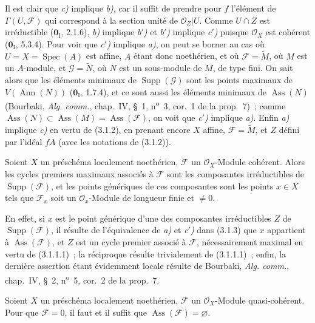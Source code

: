 Il est clair que \emph{c)} implique \emph{b)}, car il suffit de prendre pour
$f$ l'élément de $\Gamma(U,\mathcal F)$ qui correspond à la section unité de
$\mathcal O_Z|U$. Comme $U\cap Z$ est irréductible ($\mathbf{0}_{\mathrm I}$, 2.1.6),
\emph{b)} implique \emph{b$'$)} et \emph{b$'$)} implique \emph{c$'$)} puisque
$\mathcal O_X$ est cohérent ($\mathbf{0}_{\mathrm I}$, 5.3.4). Pour voir que
\emph{c$'$)} implique \emph{a)}, on peut se borner au cas où
$U=X=\operatorname{Spec}(A)$ est affine, $A$ étant donc noethérien, et où
$\mathcal F=\widetilde M$, où $M$ est un $A$-module, et
$\mathcal G=\widetilde N$, où $N$ est un sous-module de $M$, de type fini.
On sait alors que les éléments minimaux de $\operatorname{Supp}(\mathcal G)$
sont les points maximaux de $V(\operatorname{Ann}(N))$ ($\mathbf{0}_{\mathrm I}$, 1.7.4),
et ce sont aussi les éléments minimaux de $\operatorname{Ass}(N)$ (Bourbaki,
\emph{Alg. comm.}, chap.~IV, \S~1, n\textsuperscript{o}~3, cor.~1 de la
prop.~7)~; comme $\operatorname{Ass}(N)\subset\operatorname{Ass}(M)
=\operatorname{Ass}(\mathcal F)$, on voit que \emph{c$'$)} implique
\emph{a)}. Enfin \emph{a)} implique \emph{c)} en vertu de (3.1.2), en
prenant encore $X$ affine, $\mathcal F=\widetilde M$, et $Z$ défini par
l'idéal $fA$ (avec les notations de (3.1.2)).

\begin{corollary}[3.1.4]
\label{IV.2.3.1.4-fr}
Soient $X$ un préschéma localement noethérien, $\mathcal F$ un
$\mathcal O_X$-Module cohérent. Alors les cycles premiers maximaux associés à
$\mathcal F$ sont les composantes irréductibles de
$\operatorname{Supp}(\mathcal F)$, et les points génériques de ces composantes
sont les points $x\in X$ tels que $\mathcal F_x$ soit un
$\mathcal O_x$-Module de longueur finie et $\ne0$.
\end{corollary}

En effet, si $x$ est le point générique d'une des composantes irréductibles
$Z$ de $\operatorname{Supp}(\mathcal F)$, il résulte de l'équivalence de
\emph{a)} et \emph{c$'$)} dans (3.1.3) que $x$ appartient à
$\operatorname{Ass}(\mathcal F)$, et $Z$ est un cycle premier associé à
$\mathcal F$, nécessairement maximal en vertu de (3.1.1.1)~; la réciproque
résulte trivialement de (3.1.1.1)~; enfin, la dernière assertion étant
évidemment locale résulte de Bourbaki, \emph{Alg. comm.}, chap.~IV, \S~2,
n\textsuperscript{o}~5, cor.~2 de la prop.~7.

\begin{corollary}[3.1.5]
Soient $X$ un préschéma localement noethérien, $\mathcal F$ un
$\mathcal O_X$-Module quasi-cohérent. Pour que $\mathcal F=0$, il faut et il
suffit que $\operatorname{Ass}(\mathcal F)=\varnothing$.
\end{corollary}

